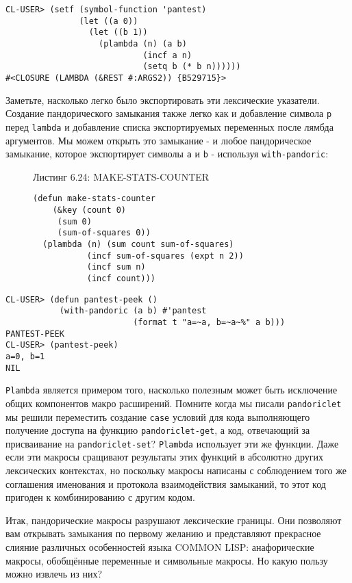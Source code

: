 \begin{verbatim}
CL-USER> (setf (symbol-function 'pantest)
               (let ((a 0))
                 (let ((b 1))
                   (plambda (n) (a b)
                            (incf a n)
                            (setq b (* b n))))))
#<CLOSURE (LAMBDA (&REST #:ARGS2)) {B529715}>
\end{verbatim}

Заметьте, насколько легко было экспортировать эти лексические указатели. Создание пандорического замыкания также легко как и добавление символа \verb"p" перед \verb"lambda" и добавление списка экспортируемых переменных после лямбда аргументов. Мы можем открыть это замыкание - и любое пандорическое замыкание, которое экспортирует символы \verb"a" и \verb"b" - используя \verb"with-pandoric":

\begin{figure}Листинг 6.24: MAKE-STATS-COUNTER\label{listing_6.24}
\listbegin
\begin{verbatim}
(defun make-stats-counter
    (&key (count 0)
     (sum 0)
     (sum-of-squares 0))
  (plambda (n) (sum count sum-of-squares)
           (incf sum-of-squares (expt n 2))
           (incf sum n)
           (incf count)))
\end{verbatim}
\listend
\end{figure}

\begin{verbatim}
CL-USER> (defun pantest-peek ()
           (with-pandoric (a b) #'pantest
                          (format t "a=~a, b=~a~%" a b)))
PANTEST-PEEK
CL-USER> (pantest-peek)
a=0, b=1
NIL
\end{verbatim}

\verb"Plambda" является примером того, насколько полезным может быть исключение общих компонентов макро расширений. Помните когда мы писали \verb"pandoriclet" мы решили переместить создание \verb"case" условий для кода выполняющего получение доступа на функцию \verb"pandoriclet-get", а код, отвечающий за присваивание на \verb"pandoriclet-set"? \verb"Plambda" использует эти же функции. Даже если эти макросы сращивают результаты этих функций в абсолютно других лексических контекстах, но поскольку макросы написаны с соблюдением того же соглашения именования и протокола взаимодействия замыканий, то этот код пригоден к комбинированию с другим кодом.

Итак, пандорические макросы разрушают лексические границы. Они позволяют вам открывать замыкания по первому желанию и представляют прекрасное слияние различных особенностей языка COMMON LISP: анафорические макросы, обобщённые переменные и символьные макросы. Но какую пользу можно извлечь из них?

